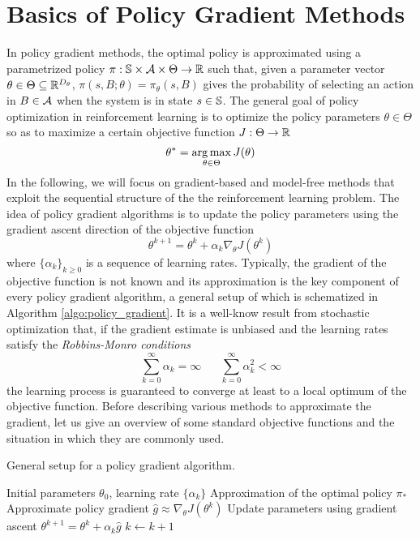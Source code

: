 \section{Basics of Policy Gradient Methods}
In policy gradient methods, the optimal policy is approximated using a parametrized 
policy $\pi: \S \times \calA \times \Theta \to \R$ such that, given a parameter vector $\theta \in \Theta \subseteq \R^{D_\theta}$, $\pi(s, B; \theta) = \pi_\theta(s, B)$ gives the probability of selecting an action in $B \in \calA$ when the system is in state $s \in \S$.
The general goal of policy optimization in reinforcement learning is to
optimize the policy parameters $\theta \in \Theta$ so as to maximize a certain
objective function $J: \Theta \to \R$
\begin{equation*}
	\theta^* = \argmax_{\theta \in \Theta} J(\theta)
\end{equation*}
In the following, we will focus on gradient-based and model-free methods that exploit
the sequential structure of the the reinforcement learning problem. The idea of
policy gradient algorithms is to update the policy parameters using the gradient ascent direction of the objective function
\begin{equation}
	\theta^{k+1} = \theta^k + \alpha_k \nabla_\theta J\left(\theta^k\right)
\end{equation}
where $\{\alpha_k\}_{k\geq 0}$ is a sequence of learning rates. Typically, the
gradient of the objective function is not known and its approximation is the key component of every policy gradient algorithm, a general setup of which is schematized in Algorithm \ref{algo:policy_gradient}. It is a well-know result from stochastic optimization \cite{kushner2003stochastic} that, if the gradient estimate is unbiased and the learning rates satisfy the \emph{Robbins-Monro conditions}
\begin{equation}
	\sum_{k=0}^\infty \alpha_k = \infty \;\;\;\;\;\; \sum^{\infty}_{k=0}
	\alpha_k^2 < \infty 
\end{equation}
the learning process is guaranteed to converge at least to a local optimum of
the objective function. Before describing various methods to approximate the gradient, let us give an overview of some standard objective functions and the situation in which they are commonly used. 

\begin{algorithm}[h!]
	\caption{General setup for a policy gradient algorithm.}
	\label{algo:policy_gradient}
	\begin{algorithmic}[1]
		\Require Initial parameters $\theta_0$, learning rate $\{\alpha_k\}$
		\Ensure Approximation of the optimal policy $\pi_*$
		\Repeat
			\State Approximate policy gradient $\widehat{g} \approx \nabla_\theta J\left(\theta^k\right)$
			\State Update parameters using gradient ascent $\theta^{k+1} = \theta^k + \alpha_k \widehat{g}$
			\State $k \leftarrow k + 1$
	\end{algorithmic}
\end{algorithm}

